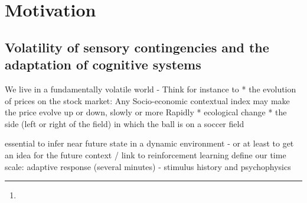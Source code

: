 \documentclass[profile,final,english, draft]{article}%
\title{\Title}%
\author{\AuthorA, 
\AuthorB,  
\AuthorC\thanks{\Address} }
\begin{document}
%
\maketitle%
\begin{abstract}
\Abstract
\end{abstract}
\section{Motivation}
\subsection{Volatility of sensory contingencies and the adaptation of cognitive systems}
 We live in a fundamentally volatile world - Think for instance to 
 * the evolution  of prices on the stock market: Any Socio-economic contextual index may make the price evolve up or down, slowly or more Rapidly    
 * ecological change 
 * the side (left or right of the field) in which the ball is on a soccer field

 
 essential to infer near future state in a dynamic environment - or at least to get an idea for the future context / link to reinforcement learning
define our time scale: adaptive response (several minutes) - stimulus history and psychophysics
 
\end{document}
